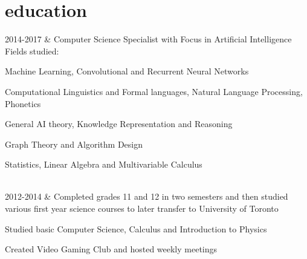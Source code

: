 \documentclass[]{cv-roald}
\begin{document}
\section*{education}
\begin{tabularcv}
    2014-2017   &   
                    \newline Computer Science Specialist with Focus in Artificial Intelligence
                    \newline Fields studied:
                    \begin{tabitemize}
                        \item Machine Learning, Convolutional and Recurrent Neural Networks
                        \item Computational Linguistics and Formal languages, Natural Language Processing, Phonetics
                        \item General AI theory, Knowledge Representation and Reasoning 
                        \item Graph Theory and Algorithm Design
                        \item Statistics, Linear Algebra and Multivariable Calculus
                    \end{tabitemize} 
                    \\[\vspacepar] %
                    
    2012-2014   &   
                    \newline Completed grades 11 and 12 in two semesters and then studied various first year science courses to later transfer to University of Toronto
                    \begin{tabitemize}
                        \item Studied basic Computer Science, Calculus and Introduction to Physics
                        \item Created Video Gaming Club and hosted weekly meetings
                    \end{tabitemize} 
                    \\[\vspacepar]
                    

\end{tabularcv}
\end{document}
